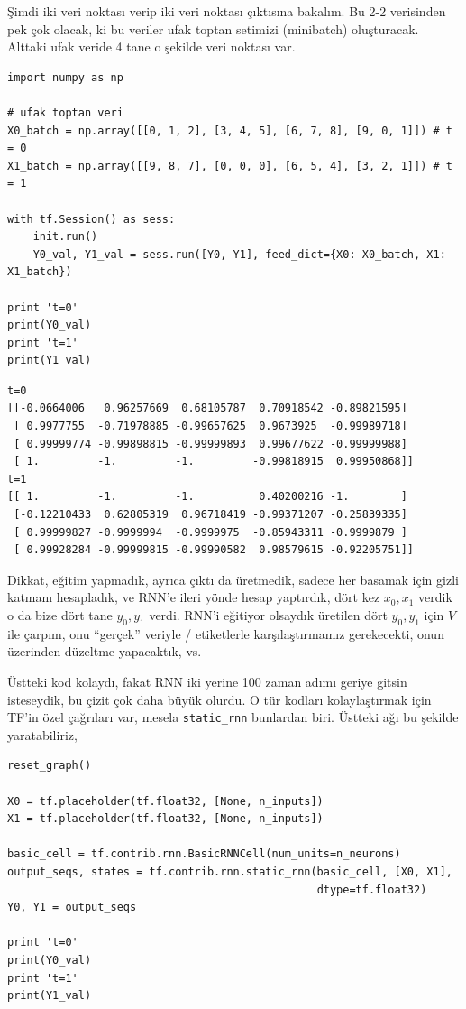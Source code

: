 \documentclass[12pt,fleqn]{article}\usepackage{../../common}
\begin{document}
Şimdi iki veri noktası verip iki veri noktası çıktısına bakalım. Bu 2-2
verisinden pek çok olacak, ki bu veriler ufak toptan setimizi (minibatch)
oluşturacak. Alttaki ufak veride 4 tane o şekilde veri noktası var.

\begin{verbatim}
import numpy as np

# ufak toptan veri
X0_batch = np.array([[0, 1, 2], [3, 4, 5], [6, 7, 8], [9, 0, 1]]) # t = 0
X1_batch = np.array([[9, 8, 7], [0, 0, 0], [6, 5, 4], [3, 2, 1]]) # t = 1

with tf.Session() as sess:
    init.run()
    Y0_val, Y1_val = sess.run([Y0, Y1], feed_dict={X0: X0_batch, X1: X1_batch})

print 't=0'
print(Y0_val)
print 't=1'
print(Y1_val)
\end{verbatim}

\begin{verbatim}
t=0
[[-0.0664006   0.96257669  0.68105787  0.70918542 -0.89821595]
 [ 0.9977755  -0.71978885 -0.99657625  0.9673925  -0.99989718]
 [ 0.99999774 -0.99898815 -0.99999893  0.99677622 -0.99999988]
 [ 1.         -1.         -1.         -0.99818915  0.99950868]]
t=1
[[ 1.         -1.         -1.          0.40200216 -1.        ]
 [-0.12210433  0.62805319  0.96718419 -0.99371207 -0.25839335]
 [ 0.99999827 -0.9999994  -0.9999975  -0.85943311 -0.9999879 ]
 [ 0.99928284 -0.99999815 -0.99990582  0.98579615 -0.92205751]]
\end{verbatim}

Dikkat, eğitim yapmadık, ayrıca çıktı da üretmedik, sadece her basamak için
gizli katmanı hesapladık, ve RNN'e ileri yönde hesap yaptırdık, dört kez
$x_0,x_1$ verdik o da bize dört tane $y_0,y_1$ verdi. RNN'i eğitiyor
olsaydık üretilen dört $y_0,y_1$ için $V$ ile çarpım, onu ``gerçek''
veriyle / etiketlerle karşılaştırmamız gerekecekti, onun üzerinden düzeltme
yapacaktık, vs.

Üstteki kod kolaydı, fakat RNN iki yerine 100 zaman adımı geriye gitsin
isteseydik, bu çizit çok daha büyük olurdu. O tür kodları kolaylaştırmak
için TF'in özel çağrıları var, mesela \verb!static_rnn! bunlardan
biri. Üstteki ağı bu şekilde yaratabiliriz,

\begin{verbatim}
reset_graph()

X0 = tf.placeholder(tf.float32, [None, n_inputs])
X1 = tf.placeholder(tf.float32, [None, n_inputs])

basic_cell = tf.contrib.rnn.BasicRNNCell(num_units=n_neurons)
output_seqs, states = tf.contrib.rnn.static_rnn(basic_cell, [X0, X1],
                                                dtype=tf.float32)
Y0, Y1 = output_seqs

print 't=0'
print(Y0_val)
print 't=1'
print(Y1_val)
\end{verbatim}
\end{document}
